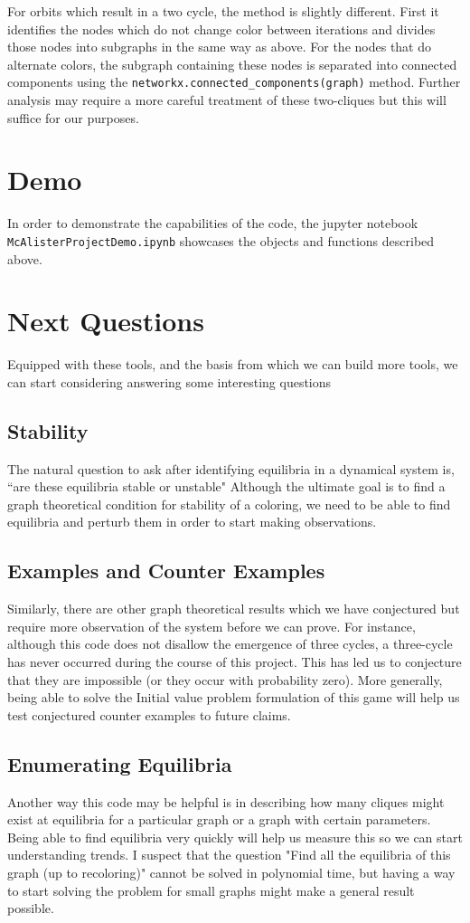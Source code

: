 \documentclass[]{article}
\begin{document}
For orbits which result in a two cycle, the method is slightly different. First it identifies the nodes which do not change color between iterations and divides those nodes into subgraphs in the same way as above. For the nodes that do alternate colors, the subgraph containing these nodes is separated into connected components using the \verb*|networkx.connected_components(graph)| method. Further analysis may require a more careful treatment of these two-cliques but this will suffice for our purposes. 
\section{Demo}
In order to demonstrate the capabilities of the code, the jupyter notebook \verb*|McAlisterProjectDemo.ipynb| showcases the objects and functions described above. 
\section{Next Questions}
Equipped with these tools, and the basis from which we can build more tools, we can start considering answering some interesting questions
\subsection{Stability}
The natural question to ask after identifying equilibria in a dynamical system is, ``are these equilibria stable or unstable" Although the ultimate goal is to find a graph theoretical condition for stability of a coloring, we need to be able to find equilibria and perturb them in order to start making observations.
\subsection{Examples and Counter Examples}
Similarly, there are other graph theoretical results which we have conjectured but require more observation of the system before we can prove. For instance, although this code does not disallow the emergence of three cycles, a three-cycle has never occurred during the course of this project. This has led us to conjecture that they are impossible (or they occur with probability zero). More generally, being able to solve the Initial value problem formulation of this game will help us test conjectured counter examples to future claims.
\subsection{Enumerating Equilibria}
Another way this code may be helpful is in describing how many cliques might exist at equilibria for a particular graph or a graph with certain parameters. Being able to find equilibria very quickly will help us measure this so we can start understanding trends. I suspect that the question "Find all the equilibria of this graph (up to recoloring)" cannot be solved in polynomial time, but having a way to start solving the problem for small graphs might make a general result possible. 
\end{document}
